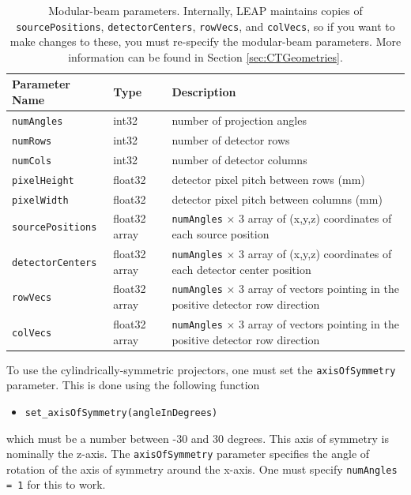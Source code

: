 \documentclass[11pt]{article}
\begin{document}
\begin{table}[h!]
\caption{Modular-beam parameters.  Internally, LEAP maintains copies of \texttt{sourcePositions}, \texttt{detectorCenters}, \texttt{rowVecs}, and \texttt{colVecs}, so if you want to make changes to these, you must re-specify the modular-beam parameters.  More information can be found in Section \ref{sec:CTGeometries}.} \label{tab:modularParameters}
\begin{tabular}{l|l|p{9cm}}
Parameter Name & Type & Description \\
\hline
\texttt{numAngles} & int32 & number of projection angles \\
\texttt{numRows} & int32 & number of detector rows \\
\texttt{numCols} & int32 & number of detector columns \\
\texttt{pixelHeight} & float32 & detector pixel pitch between rows (mm) \\
\texttt{pixelWidth} & float32 & detector pixel pitch between columns (mm) \\
\texttt{sourcePositions} & float32 array & \texttt{numAngles} $\times$ 3 array of (x,y,z) coordinates of each source position \\
\texttt{detectorCenters} & float32 array & \texttt{numAngles} $\times$ 3 array of (x,y,z) coordinates of each detector center position \\
\texttt{rowVecs} & float32 array & \texttt{numAngles} $\times$ 3 array of vectors pointing in the positive detector row direction \\
\texttt{colVecs} & float32 array & \texttt{numAngles} $\times$ 3 array of vectors pointing in the positive detector row direction
\end{tabular}
\end{table}

To use the cylindrically-symmetric projectors, one must set the \texttt{axisOfSymmetry} parameter.  This is done using the following function
\begin{itemize}
    \item[] \texttt{set\_axisOfSymmetry(angleInDegrees)}
\end{itemize}
which must be a number between -30 and 30 degrees.  This axis of symmetry is nominally the z-axis.  The \texttt{axisOfSymmetry} parameter specifies the angle of rotation of the axis of symmetry around the x-axis.  One must specify \texttt{numAngles = 1} for this to work.
\end{document}
